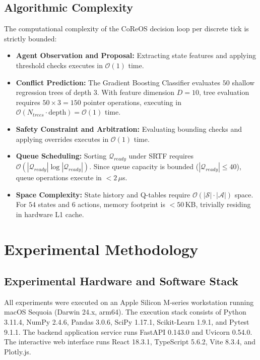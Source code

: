 \documentclass[conference]{IEEEtran}
\begin{document}
\subsection{Algorithmic Complexity}
The computational complexity of the CoReOS decision loop per discrete tick is strictly bounded:
\begin{itemize}
    \item \textbf{Agent Observation and Proposal:} Extracting state features and applying threshold checks executes in $\mathcal{O}(1)$ time.
    \item \textbf{Conflict Prediction:} The Gradient Boosting Classifier evaluates $50$ shallow regression trees of depth $3$. With feature dimension $D=10$, tree evaluation requires $50 \times 3 = 150$ pointer operations, executing in $\mathcal{O}(N_{trees} \cdot \text{depth}) = \mathcal{O}(1)$ time.
    \item \textbf{Safety Constraint and Arbitration:} Evaluating bounding checks and applying overrides executes in $\mathcal{O}(1)$ time.
    \item \textbf{Queue Scheduling:} Sorting $\mathcal{Q}_{ready}$ under SRTF requires $\mathcal{O}(|\mathcal{Q}_{ready}| \log |\mathcal{Q}_{ready}|)$. Since queue capacity is bounded ($|\mathcal{Q}_{ready}| \le 40$), queue operations execute in $< 2$\,$\mu$s.
    \item \textbf{Space Complexity:} State history and Q-tables require $\mathcal{O}(|\mathcal{S}| \cdot |\mathcal{A}|)$ space. For $54$ states and $6$ actions, memory footprint is $< 50$\,KB, trivially residing in hardware L1 cache.
\end{itemize}

\section{Experimental Methodology}
\label{sec:experimental_methodology}

\subsection{Experimental Hardware and Software Stack}
All experiments were executed on an Apple Silicon M-series workstation running macOS Sequoia (Darwin 24.x, arm64). The execution stack consists of Python 3.11.4, NumPy 2.4.6, Pandas 3.0.6, SciPy 1.17.1, Scikit-Learn 1.9.1, and Pytest 9.1.1. The backend application service runs FastAPI 0.143.0 and Uvicorn 0.54.0. The interactive web interface runs React 18.3.1, TypeScript 5.6.2, Vite 8.3.4, and Plotly.js.
\end{document}
